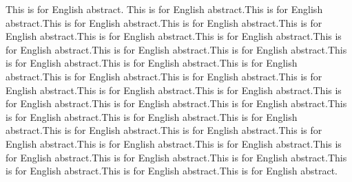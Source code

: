 This is for English abstract. This is for English abstract.This is for English abstract.This is for English abstract.This is for English abstract.This is for English abstract.This is for English abstract.This is for English abstract.This is for English abstract.This is for English abstract.This is for English abstract.This is for English abstract.This is for English abstract.This is for English abstract.This is for English abstract.This is for English abstract.This is for English abstract.This is for English abstract.This is for English abstract.This is for English abstract.This is for English abstract.This is for English abstract.This is for English abstract.This is for English abstract.This is for English abstract.This is for English abstract.This is for English abstract.This is for English abstract.This is for English abstract.This is for English abstract.This is for English abstract.This is for English abstract.This is for English abstract.This is for English abstract.This is for English abstract.This is for English abstract.
